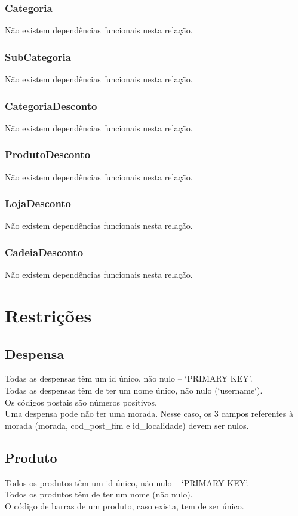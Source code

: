 \documentclass{report}
\begin{document}
\subsection{Categoria}
Não existem dependências funcionais nesta relação.

\subsection{SubCategoria}
Não existem dependências funcionais nesta relação.

\subsection{CategoriaDesconto}
Não existem dependências funcionais nesta relação.

\subsection{ProdutoDesconto}
Não existem dependências funcionais nesta relação.

\subsection{LojaDesconto}
Não existem dependências funcionais nesta relação.

\subsection{CadeiaDesconto}
Não existem dependências funcionais nesta relação.

\chapter{Restrições}
\section{Despensa}
Todas as despensas têm um id único, não nulo -- `PRIMARY KEY'.\\
Todas as despensas têm de ter um nome único, não nulo (`username`).\\
Os códigos postais são números positivos.\\
Uma despensa pode não ter uma morada. Nesse caso, os 3 campos referentes à morada
(morada, cod\_post\_fim e id\_localidade) devem ser nulos.
\section{Produto}
Todos os produtos têm um id único, não nulo -- `PRIMARY KEY'.\\
Todos os produtos têm de ter um nome (não nulo).\\
O código de barras de um produto, caso exista, tem de ser único.
\end{document}
